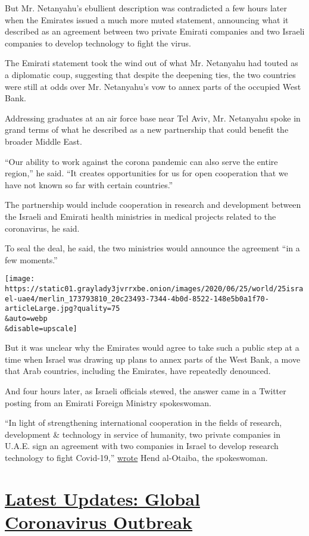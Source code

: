 But Mr. Netanyahu's ebullient description was contradicted a few hours
later when the Emirates issued a much more muted statement, announcing
what it described as an agreement between two private Emirati companies
and two Israeli companies to develop technology to fight the virus.

The Emirati statement took the wind out of what Mr. Netanyahu had touted
as a diplomatic coup, suggesting that despite the deepening ties, the
two countries were still at odds over Mr. Netanyahu's vow to annex parts
of the occupied West Bank.

Addressing graduates at an air force base near Tel Aviv, Mr. Netanyahu
spoke in grand terms of what he described as a new partnership that
could benefit the broader Middle East.

``Our ability to work against the corona pandemic can also serve the
entire region,'' he said. ``It creates opportunities for us for open
cooperation that we have not known so far with certain countries.''

The partnership would include cooperation in research and development
between the Israeli and Emirati health ministries in medical projects
related to the coronavirus, he said.

To seal the deal, he said, the two ministries would announce the
agreement ``in a few moments.''

\texttt{[image: https://static01.graylady3jvrrxbe.onion/images/2020/06/25/world/25israel-uae4/merlin\_173793810\_20c23493-7344-4b0d-8522-148e5b0a1f70-articleLarge.jpg?quality=75\\\&auto=webp\\\&disable=upscale]}

But it was unclear why the Emirates would agree to take such a public
step at a time when Israel was drawing up plans to annex parts of the
West Bank, a move that Arab countries, including the Emirates, have
repeatedly denounced.

And four hours later, as Israeli officials stewed, the answer came in a
Twitter posting from an Emirati Foreign Ministry spokeswoman.

``In light of strengthening international cooperation in the fields of
research, development \& technology in service of humanity, two private
companies in U.A.E. sign an agreement with two companies in Israel to
develop research technology to fight Covid-19,''
\href{https://twitter.com/hend_mana/status/1276231716030513152}{wrote}
Hend al-Otaiba, the spokeswoman.

\hypertarget{latest-updates-global-coronavirus-outbreak}{%
\section{\texorpdfstring{\href{https://www.nytimes3xbfgragh.onion/2020/08/04/world/coronavirus-cases.html?action=click\&pgtype=Article\&state=default\&region=MAIN_CONTENT_1\&context=storylines_live_updates}{Latest
Updates: Global Coronavirus
Outbreak}}{Latest Updates: Global Coronavirus Outbreak}}\label{latest-updates-global-coronavirus-outbreak}}

